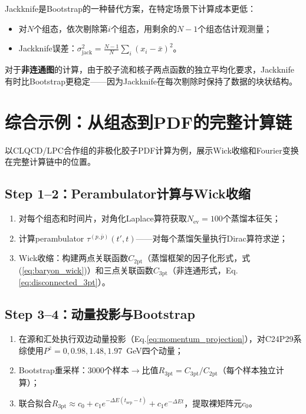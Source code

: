\documentclass[12pt,a4paper]{ctexart}
\theoremstyle{definition}
\begin{document}
Jackknife是Bootstrap的一种替代方案，在特定场景下计算成本更低：
\begin{itemize}
    \item 对$N$个组态，依次剔除第$i$个组态，用剩余的$N-1$个组态估计观测量；
    \item Jackknife误差：$\sigma^2_{\text{jack}} = \frac{N-1}{N} \sum_i (x_i - \bar{x})^2$。
\end{itemize}

对于\textbf{非连通图}的计算，由于胶子流和核子两点函数的独立平均化要求，Jackknife有时比Bootstrap更稳定——因为Jackknife在每次剔除时保持了数据的块状结构。

\section{综合示例：从组态到PDF的完整计算链}

以CLQCD/LPC合作组的非极化胶子PDF计算\cite{Chen2025gluon}为例，展示Wick收缩和Fourier变换在完整计算链中的位置。

\subsection{Step 1--2：Perambulator计算与Wick收缩}

\begin{enumerate}
    \item 对每个组态和时间片，对角化Laplace算符获取$N_{\text{ev}} = 100$个蒸馏本征矢；
    \item 计算perambulator $\tau^{(p,\bar{p})}(t', t)$——对每个蒸馏矢量执行Dirac算符求逆；
    \item Wick收缩：构建两点关联函数$C_{\text{2pt}}$（蒸馏框架的因子化形式，式(\ref{eq:baryon_wick})）和三点关联函数$C_{\text{3pt}}$（非连通形式，Eq.\ref{eq:disconnected_3pt}）。
\end{enumerate}

\subsection{Step 3--4：动量投影与Bootstrap}

\begin{enumerate}
    \item 在源和汇处执行双边动量投影（Eq.\ref{eq:momentum_projection}），对C24P29系综使用$P^z = 0, 0.98, 1.48, 1.97$~GeV四个动量；
    \item Bootstrap重采样：3000个样本$\to$比值$R_{\text{3pt}} = C_{\text{3pt}}/C_{\text{2pt}}$（每个样本独立计算）；
    \item 联合拟合$R_{\text{3pt}} \approx c_0 + c_1 e^{-\Delta E(t_{\text{sep}}-t)} + c_1 e^{-\Delta E t}$，提取裸矩阵元$c_0$。
\end{enumerate}
\end{document}
